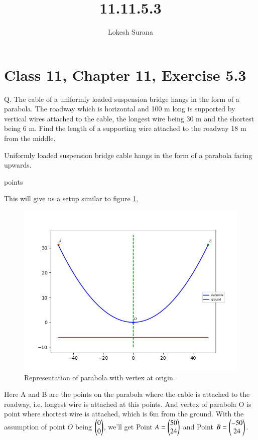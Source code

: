 \documentclass[journal,12pt,twocolumn]{IEEEtran}
\begin{document}
\vspace{3cm}
\title{11.11.5.3}
\author{Lokesh Surana}
\maketitle
\section*{Class 11, Chapter 11, Exercise 5.3}

Q. The cable of a uniformly loaded suspension bridge hangs in the form of a parabola. The roadway which is horizontal and 100 m long is supported by vertical wires attached to the cable, the longest wire being 30 m and the shortest being 6 m. Find the length of a supporting wire attached to the roadway 18 m from the middle.

\solution
Uniformly loaded suspension bridge cable hangs in the form of a parabola facing upwards.

\begin{table}[ht!]
    
    \caption{points}
    \label{tab:points}
\end{table}

This will give us a setup similar to figure \ref{fig:Cable}, 

\begin{figure}[!htb]
    \centering
    \includegraphics[width=\columnwidth]{figs/1.png}
    \caption{Representation of parabola with vertex at origin.}
    \label{fig:Cable}
\end{figure}

Here A and B are the points on the parabola where the cable is attached to the roadway, i.e. longest wire is attached at this points. And vertex of parabola O is point where shortest wire is attached, which is 6m from the ground.
With the assumption of point $O$ being $\begin{pmatrix}0\\0\end{pmatrix}$, we'll get Point $A = \begin{pmatrix}50\\24\end{pmatrix}$ and Point $B = \begin{pmatrix}-50\\24\end{pmatrix}$.  
\end{document}
